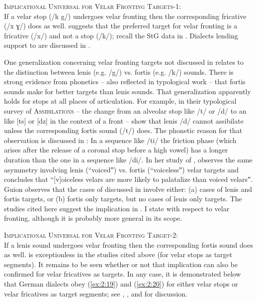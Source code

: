 \begin{xlist}
\begin{xlist}
\eanoraggedright%
    \label{ex:2:19}
          \textsc{{Implicational} \textsc{Universal} \textsc{for} \textsc{Velar} \textsc{Fronting} \textsc{Targets-1}}:\\
          If a velar stop (/k g/) undergoes velar fronting then the corresponding fricative (/x ɣ/) does as well.
\z
{} suggests that the preferred target for velar fronting is a fricative (/x/) and not a stop (/k/); recall the StG data in . Dialects lending support to  are discussed in .

One generalization concerning velar fronting targets not discussed in \citet{Bateman2007,Bateman2011} relates to the distinction between lenis (e.g. /g/) vs. fortis (e.g. /k/) sounds. There is strong evidence from phonetics -- also reflected in typological work -- that fortis sounds make for better targets than lenis sounds. That generalization apparently holds for stops at all places of articulation. For example, in their typological survey of \textsc{Assibilations} -- the change from an alveolar stop like /t/ or /d/ to an  like [ts] or [dz] in the context of a front  -- \citet{HallHamann2006} show that lenis /d/ cannot assibilate unless the corresponding fortis sound (/t/) does. The phonetic reason for that observation is discussed in \citet{HallZygis2006}: In a sequence like /ti/ the friction phase (which arises after the release of a coronal stop before a high vowel) has a longer duration than the one in a sequence like /di/. In her study of , \citet[20]{Guion1998} observes the same asymmetry involving lenis (“voicedˮ) vs. fortis (“voicelessˮ) velar targets and concludes that “[v]oiceless velars are more likely to palatalize than voiced velarsˮ. Guion observes that the cases of  discussed in \citet{Bhat1978} involve either: (a) cases of lenis and fortis targets, or (b) fortis only targets, but no cases of lenis only targets. The studies cited here suggest the implication in . I state  with respect to velar fronting, although it is probably more general in its scope.

\eanoraggedright%
    \label{ex:2:20}
          \textsc{{Implicational} \textsc{Universal} \textsc{for} \textsc{Velar} \textsc{Fronting} \textsc{Target-2}}:\\
          If a lenis sound undergoes velar fronting then the corresponding fortis sound does as well.
\z
{} is exceptionless in the studies cited above (for velar stops as target segments). It remains to be seen whether or not that implication can also be confirmed for velar fricatives as targets. In any case, it is demonstrated below that German dialects obey (\ref{ex:2:19}) and (\ref{ex:2:20}) for either velar stops or velar fricatives as target segments; see , , and  for discussion.


\end{xlist}
\end{xlist}
